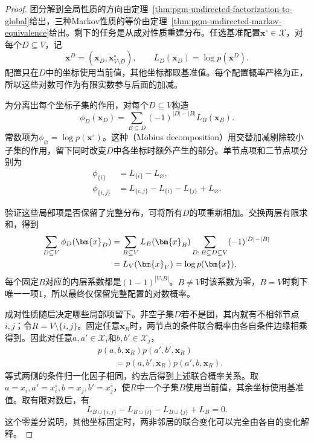 \begin{proof}
团分解到全局性质的方向由定理~\ref{thm:pgm-undirected-factorization-to-global}给出，三种Markov性质的等价由定理~\ref{thm:pgm-undirected-markov-equivalence}给出。剩下的任务是从成对性质重建分布。任选基准配置$\bm{x}^{\circ}\in\mathcal{X}$，对每个$D\subseteq V$，记
\[
  \bm{x}^{D}=(\bm{x}_D,\bm{x}^{\circ}_{V\setminus D}),
  \qquad
  L_D(\bm{x}_D)=\log p(\bm{x}^{D}).
\]
配置只在$D$中的坐标使用当前值，其他坐标都取基准值。每个配置概率严格为正，所以这些对数可作为有限实数参与后面的加减。

为分离出每个坐标子集的作用，对每个$D\subseteq V$构造
\begin{equation}
  \phi_D(\bm{x}_D)
  =\sum_{B\subseteq D}(-1)^{|D|-|B|}L_B(\bm{x}_B).
  \label{eq:pgm-undirected-mobius}
\end{equation}
常数项为$\phi_{\varnothing}=\log p(\bm{x}^{\circ})$。这种（Möbius decomposition）用交替加减剔除较小子集的作用，留下同时改变$D$中各坐标时额外产生的部分。单节点项和二节点项分别为
\[
  \begin{aligned}
    \phi_{\{i\}}&=L_{\{i\}}-L_{\varnothing},\\
    \phi_{\{i,j\}}
      &=L_{\{i,j\}}-L_{\{i\}}-L_{\{j\}}+L_{\varnothing}.
  \end{aligned}
\]

验证这些局部项是否保留了完整分布，可将所有$D$的项重新相加。交换两层有限求和，得到
\begin{align}
  \sum_{D\subseteq V}\phi_D(\bm{x}_D)
  &=\sum_{B\subseteq V}L_B(\bm{x}_B)
      \sum_{D:\,B\subseteq D\subseteq V}(-1)^{|D|-|B|}
      \notag\\
  &=L_V(\bm{x}_V)=\log p(\bm{x}).
  \label{eq:pgm-undirected-mobius-inversion}
\end{align}
每个固定$B$对应的内层系数都是$(1-1)^{|V\setminus B|}$。$B\neq V$时该系数为零，$B=V$时剩下唯一一项$1$，所以最终仅保留完整配置的对数概率。

成对性质随后决定哪些局部项留下。非空子集$D$若不是团，其内就有不相邻节点$i,j$；令$R=V\setminus\{i,j\}$。固定任意$\bm{x}_R$时，两节点的条件联合概率由各自条件边缘相乘得到。因此对任意$a,a'\in\mathcal{X}_i$和$b,b'\in\mathcal{X}_j$，
\begin{equation}
  \begin{aligned}
    &p(a,b,\bm{x}_R)p(a',b',\bm{x}_R)\\
    &\qquad=p(a,b',\bm{x}_R)p(a',b,\bm{x}_R).
  \end{aligned}
  \label{eq:pgm-undirected-rectangle}
\end{equation}
等式两侧的条件归一化因子相同，约去后得到上述联合概率关系。取$a=x_i,a'=x_i^{\circ},b=x_j,b'=x_j^{\circ}$，使$R$中一个子集$B$使用当前值，其余坐标使用基准值。取有限对数后，有
\[
  L_{B\cup\{i,j\}}-L_{B\cup\{i\}}
  -L_{B\cup\{j\}}+L_B=0.
\]
这个零差分说明，其他坐标固定时，两非邻居的联合变化可以完全由各自的变化解释。


\end{proof}
